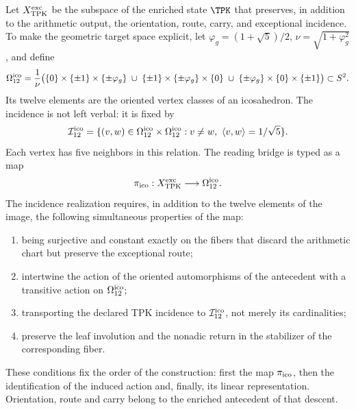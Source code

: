Let \(X_{\rm TPK}^{\rm exc}\) be the subspace of the enriched state \(\TPK\)
that preserves, in addition to the arithmetic output, the orientation, route,
carry, and exceptional incidence. To make the geometric target space explicit,
let \(\varphi_g=(1+\sqrt5)/2\), \(\nu=\sqrt{1+\varphi_g^2}\), and define
\begin{equation}
\label{ii:ii:pent:eq:gravity-icosahedron-vertices}
\Omega_{12}^{\rm ico}
=\frac1\nu\bigl(
\{0\}\times\{\pm1\}\times\{\pm\varphi_g\}
\;\cup\;
\{\pm1\}\times\{\pm\varphi_g\}\times\{0\}
\;\cup\;
\{\pm\varphi_g\}\times\{0\}\times\{\pm1\}
\bigr)\subset S^2.
\end{equation}
Its twelve elements are the oriented vertex classes of an icosahedron.
The incidence is not left verbal: it is fixed by
\begin{equation}
\label{ii:ii:pent:eq:gravity-icosahedron-incidence}
\mathcal I_{12}^{\rm ico}
=\{(v,w)\in\Omega_{12}^{\rm ico}\times\Omega_{12}^{\rm ico}:
v\neq w,\ \langle v,w\rangle=1/\sqrt5\}.
\end{equation}
Each vertex has five neighbors in this relation. The reading bridge
is typed as a map
\begin{equation}
\label{ii:ii:pent:eq:gravity-exceptional-reader-map}
\pi_{\rm ico}:X_{\rm TPK}^{\rm exc}\longrightarrow\Omega_{12}^{\rm ico}.
\end{equation}
The incidence realization requires, in addition to the twelve elements of the
image, the following simultaneous properties of the map:
\begin{enumerate}[label=(\roman*)]
\item being surjective and constant exactly on the fibers that
discard the arithmetic chart but preserve the exceptional route;
\item intertwine the action of the oriented automorphisms of the antecedent
with a transitive action on \(\Omega_{12}^{\rm ico}\);
\item transporting the declared TPK incidence to
\(\mathcal I_{12}^{\rm ico}\), not
merely its cardinalities;
\item preserve the leaf involution and the nonadic return in the
stabilizer of the corresponding fiber.
\end{enumerate}

These conditions fix the order of the construction: first the map
\(\pi_{\rm ico}\), then the identification of the induced action and,
finally, its linear representation. Orientation, route and carry
belong to the enriched antecedent of that descent.


